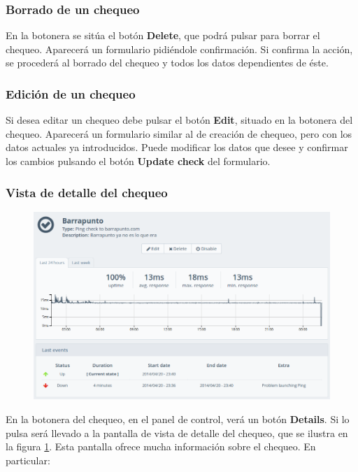 \subsubsection{Borrado de un chequeo}

En la botonera se sitúa el botón \textbf{Delete}, que podrá pulsar para borrar
el chequeo. Aparecerá un formulario pidiéndole confirmación. Si confirma la
acción, se procederá al borrado del chequeo y todos los datos dependientes de
éste.

\subsubsection{Edición de un chequeo}

Si desea editar un chequeo debe pulsar el botón \textbf{Edit}, situado en la
botonera del chequeo. Aparecerá un formulario similar al de creación de chequeo,
pero con los datos actuales ya introducidos. Puede modificar los datos que desee
y confirmar los cambios pulsando el botón \textbf{Update check} del formulario.

\subsubsection{Vista de detalle del chequeo}

\begin{figure}[hbtp]
  \centering
  \includegraphics[width=\textwidth]{apendice_manual_usuario/pantalla_detalle_chequeo.png}
  \caption{}
  \label{fig:detalle-chequeo}
\end{figure}

En la botonera del chequeo, en el panel de control, verá un botón
\textbf{Details}. Si lo pulsa será llevado a la pantalla de vista de detalle del
chequeo, que se ilustra en la figura \ref{fig:detalle-chequeo}. Esta pantalla
ofrece mucha información sobre el chequeo. En particular:

